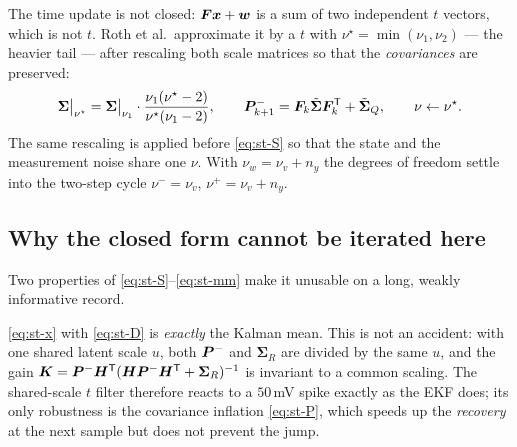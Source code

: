 The time update is not closed: $\bm{F}\bm{x}+\bm{w}$ is a sum of two independent $t$ vectors, which is not
$t$.  Roth et al.\ approximate it by a $t$ with $\nu^\star=\min(\nu_1,\nu_2)$ --- the heavier tail
--- after rescaling both scale matrices so that the \emph{covariances} are preserved:
\begin{equation}
\bm\Sigma\big|_{\nu^\star}=\bm\Sigma\big|_{\nu_1}\cdot
 \frac{\nu_1(\nu^\star-2)}{\nu^\star(\nu_1-2)},
\qquad
\bm{P}^{-}_{k+1}=\bm{F}_k\tilde{\bm\Sigma}\bm{F}_k^{\mathsf{T}}+\tilde{\bm\Sigma}_Q,
\qquad \nu\leftarrow\nu^\star.
\label{eq:st-mm}
\end{equation}
The same rescaling is applied before \eqref{eq:st-S} so that the state and the measurement noise
share one $\nu$.  With $\nu_w=\nu_v+n_y$ the degrees of freedom settle into the two-step cycle
$\nu^-=\nu_v$, $\nu^+=\nu_v+n_y$.

\subsection{Why the closed form cannot be iterated here}\label{sec:st-fail}
Two properties of \eqref{eq:st-S}--\eqref{eq:st-mm} make it unusable on a long, weakly informative
record.

\begin{remark}\label{rem:st-nomean}
\eqref{eq:st-x} with \eqref{eq:st-D} is \emph{exactly} the Kalman mean.  This is not an accident:
with one shared latent scale $u$, both $\bm{P}^{-}$ and $\bm\Sigma_R$ are divided by the same $u$, and
the gain $\bm{K}=\bm{P}^{-}\bm{H}^{\mathsf{T}}(\bm{H}\bm{P}^{-}\bm{H}^{\mathsf{T}}+\bm\Sigma_R)^{-1}$ is invariant to a common scaling.
The shared-scale $t$ filter therefore reacts to a $50$\,mV spike exactly as the EKF does; its only
robustness is the covariance inflation \eqref{eq:st-P}, which speeds up the \emph{recovery} at the
next sample but does not prevent the jump.
\end{remark}

